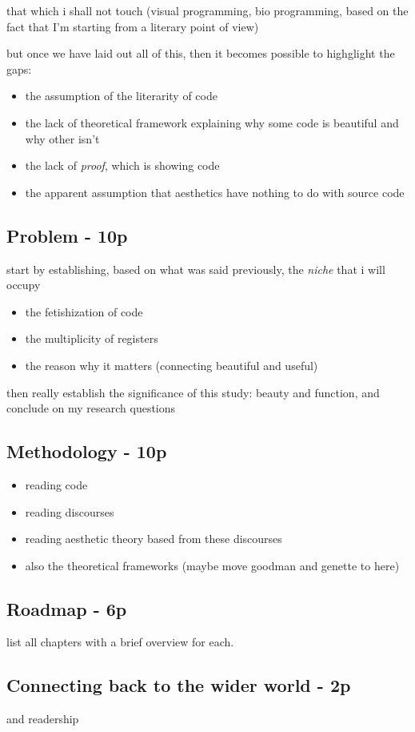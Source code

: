 that which i shall not touch (visual programming, bio programming, based on the fact that I'm starting from a literary point of view)

but once we have laid out all of this, then it becomes possible to highglight the gaps:
\begin{itemize}
    \item the assumption of the literarity of code
    \item the lack of theoretical framework explaining why some code is beautiful and why other isn't
    \item the lack of \emph{proof}, which is showing code
    \item the apparent assumption that aesthetics have nothing to do with source code
\end{itemize}

\subsection{Problem - 10p}

start by establishing, based on what was said previously, the \emph{niche} that i will occupy

\begin{itemize}
    \item the fetishization of code
    \item the multiplicity of registers
    \item the reason why it matters (connecting beautiful and useful)
\end{itemize}

then really establish the significance of this study: beauty and function, and conclude on my research questions

\subsection{Methodology - 10p}

\begin{itemize}
    \item reading code
    \item reading discourses
    \item reading aesthetic theory based from these discourses
    \item also the theoretical frameworks (maybe move goodman and genette to here)
\end{itemize}

\subsection{Roadmap - 6p}

list all chapters with a brief overview for each.

\subsection{Connecting back to the wider world - 2p}

and readership